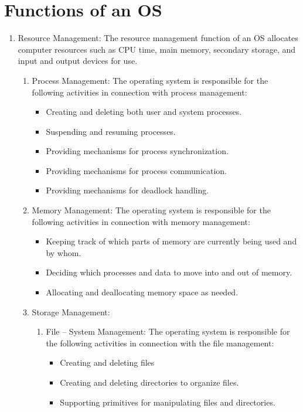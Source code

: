 \documentclass[11pt,a4paper]{article}
\begin{document}
	\newpage
	\section{Functions of an OS}
	\begin{enumerate}
		\item Resource Management:  The resource management function of an OS allocates computer resources such as CPU time, main memory, secondary storage, and input and output devices for use.
		\begin{enumerate}
		  \item Process Management:  The operating system is responsible for the following activities in connection with process management:
		  \begin{itemize}
			\item Creating and deleting both user and system processes.
		  	\item Suspending and resuming processes.
		  	\item Providing mechanisms for process synchronization.
		  	\item Providing mechanisms for process communication.
		  	\item Providing mechanisms for deadlock handling.
		  \end{itemize}
		\item Memory Management:  The operating system is responsible for the following activities in connection with memory management:
		\begin{itemize}
			\item Keeping track of which parts of memory are currently being used and by whom.
			\item Deciding which processes and data to move into and out of memory.
			\item Allocating and deallocating memory space as needed.
		\end{itemize}
		\item Storage Management:
		\begin{enumerate}
		\item File – System Management:  The operating system is responsible for the following activities in connection with the file management:
		\begin{itemize}
		\item Creating and deleting files
		\item Creating and deleting directories to organize files.
		\item Supporting primitives for manipulating files and directories.

\end{itemize}
\end{enumerate}
\end{enumerate}
\end{enumerate}
\end{document}
